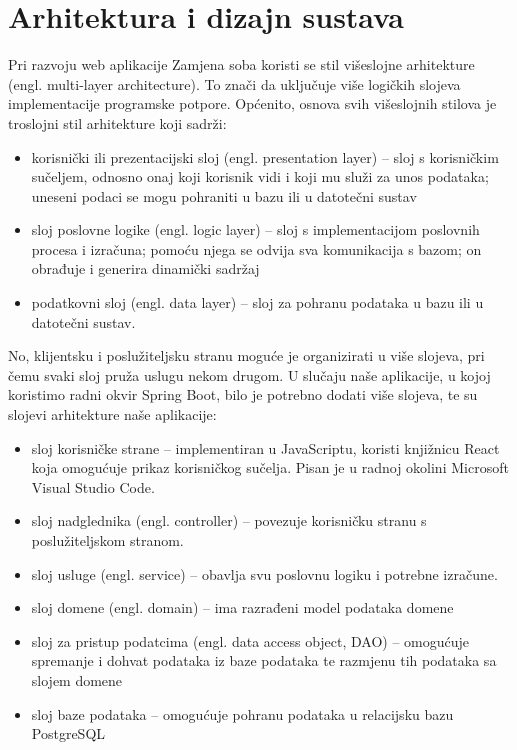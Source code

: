 \chapter{Arhitektura i dizajn sustava}
		
		Pri razvoju web aplikacije Zamjena soba koristi se stil višeslojne arhitekture (engl. multi-layer architecture). To znači da uključuje više logičkih slojeva implementacije programske potpore. Općenito, osnova svih višeslojnih stilova je troslojni stil arhitekture koji sadrži:
		\begin{itemize}
		\item 	korisnički ili prezentacijski sloj (engl. presentation layer) – sloj s korisničkim sučeljem, odnosno onaj koji korisnik vidi i koji mu služi za unos podataka; uneseni podaci se mogu pohraniti u bazu ili u datotečni sustav
		\item 	sloj poslovne logike (engl. logic layer) – sloj s implementacijom poslovnih procesa i izračuna; pomoću njega se odvija sva komunikacija s bazom; on obrađuje i generira dinamički sadržaj 
		\item 	podatkovni sloj (engl. data layer) – sloj za pohranu podataka u bazu ili u datotečni sustav.
		\end{itemize}
		
		No,  klijentsku i poslužiteljsku stranu moguće je organizirati u više slojeva, pri čemu svaki sloj pruža uslugu nekom drugom.
	U slučaju naše aplikacije, u kojoj koristimo radni okvir Spring Boot, bilo je potrebno dodati više slojeva, te su slojevi arhitekture naše aplikacije:
		\begin{itemize}
		\item 	sloj korisničke strane – implementiran u JavaScriptu, koristi knjižnicu React koja omogućuje prikaz korisničkog sučelja. Pisan je u radnoj okolini Microsoft Visual Studio Code.
		\item 	sloj nadglednika (engl. controller) – povezuje korisničku stranu s poslužiteljskom stranom.
		\item 	sloj usluge (engl. service) – obavlja svu poslovnu logiku i potrebne izračune.
		\item 	sloj domene (engl. domain) – ima razrađeni model podataka domene
		\item 	sloj za pristup podatcima (engl. data access object, DAO) – omogućuje spremanje i dohvat podataka iz baze podataka te razmjenu tih podataka sa slojem domene
		\item 	sloj baze podataka – omogućuje pohranu podataka u relacijsku bazu PostgreSQL
	\end{itemize}
		
